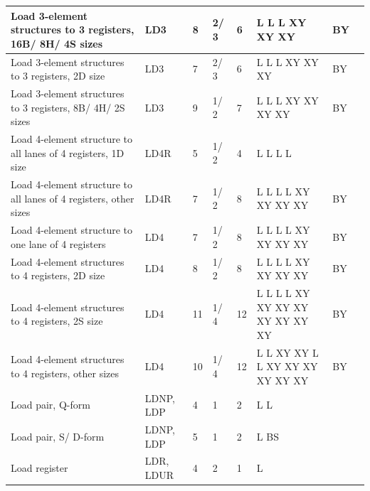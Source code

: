 \begin{longtable}{|p{1in}|p{1in}|l|l|l|p{1in}|l|p{1in}|}
\hline
Load 3-element structures to 3 registers, 16B/ 8H/ 4S sizes & LD3 & 8 & 2/ 3 & 6 & L L L XY XY XY & BY & \\
\hline
Load 3-element structures to 3 registers, 2D size & LD3 & 7 & 2/ 3 & 6 & L L L XY XY XY & BY & \\
\hline
Load 3-element structures to 3 registers, 8B/ 4H/ 2S sizes & LD3 & 9 & 1/ 2 & 7 & L L L XY XY XY XY & BY & \\
\hline
Load 4-element structure to all lanes of 4 registers, 1D size & LD4R & 5 & 1/ 2 & 4 & L L L L &  & \\
\hline
Load 4-element structure to all lanes of 4 registers, other sizes & LD4R & 7 & 1/ 2 & 8 & L L L L XY XY XY XY & BY & \\
\hline
Load 4-element structure to one lane of 4 registers & LD4 & 7 & 1/ 2 & 8 & L L L L XY XY XY XY & BY & \\
\hline
Load 4-element structures to 4 registers, 2D size & LD4 & 8 & 1/ 2 & 8 & L L L L XY XY XY XY & BY & \\
\hline
Load 4-element structures to 4 registers, 2S size & LD4 & 11 & 1/ 4 & 12 & L L L L XY XY XY XY XY XY XY XY & BY & \\
\hline
Load 4-element structures to 4 registers, other sizes & LD4 & 10 & 1/ 4 & 12 & L L XY XY L L XY XY XY XY XY XY & BY & \\
\hline
Load pair, Q-form & LDNP, LDP & 4 & 1 & 2 & L L &  & \\
\hline
Load pair, S/ D-form & LDNP, LDP & 5 & 1 & 2 & L BS &  & \\
\hline
Load register & LDR, LDUR & 4 & 2 & 1 & L &  & \\
\hline
\end{longtable}
\newpage
